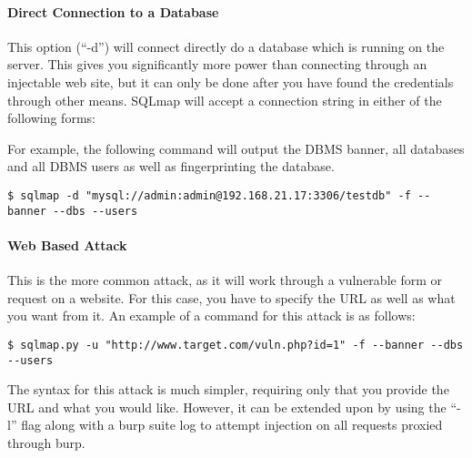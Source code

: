 			\paragraph{Direct Connection to a Database}
				This option (``-d'') will connect directly do a database which is running on the server. 
				This gives you significantly more power than connecting through an injectable web site, but it can only be done after you have found the credentials through other means. 
				SQLmap will accept a connection string in either of the following forms:
				
				For example, the following command will output the DBMS banner, all databases and all DBMS users as well as fingerprinting the database. 
				\begin{lstlisting}[style=CLI]
					$ sqlmap -d "mysql://admin:admin@192.168.21.17:3306/testdb" -f --banner --dbs --users
				\end{lstlisting}

			\paragraph{Web Based Attack}
				This is the more common attack, as it will work through a vulnerable form or request on a website. 
				For this case, you have to specify the URL as well as what you want from it. 
				An example of a command for this attack is as follows:
				\begin{lstlisting}[style=CLI]
					$ sqlmap.py -u "http://www.target.com/vuln.php?id=1" -f --banner --dbs --users
				\end{lstlisting}

				The syntax for this attack is much simpler, requiring only that you provide the URL and what you would like. 
				However, it can be extended upon by using the ``-l'' flag along with a burp suite log to attempt injection on all requests proxied through burp. 

